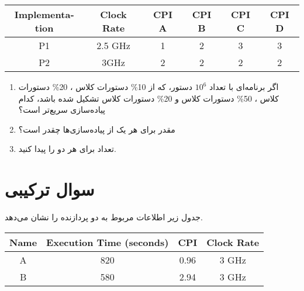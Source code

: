 \documentclass[11pt]{article}
\newcommand{\hosna}{حسنا رجایی}
\newcommand{\cpi}{\lr{CPI} }
\begin{document}
\begin{table}[H]
    \begin{latin}
        \begin{center}
            \begin{tabular}{|c|c|c|c|c|c|}
                \hline
                Implementation & Clock Rate & CPI A & CPI B & CPI C & CPI D \\
                \hline
                P1 & 2.5 GHz & 1 & 2 & 3 & 3 \\
                \hline
                P2 & 3GHz & 2 &  2 & 2 &  2 \\
                \hline
            \end{tabular}
        \end{center}
    \end{latin}
\end{table}

\begin{enumerate}
    \item 
    اگر برنامه‌ای با تعداد 
    $10^6$
    دستور، که از 
    10\% دستورات کلاس ،
    20\% دستورات کلاس ،
    50\% دستورات کلاس  و
    20\% دستورات کلاس  
    تشکیل شده باشد، کدام پیاده‌سازی سریع‌تر است؟
    \item 
    مقدر \cpi برای هر یک از پیاده‌سازی‌ها چقدر است؟
    \item 
    تعداد  برای هر دو را پیدا‌ کنید.
\end{enumerate}

\section[سوال ترکیبی]{سوال ترکیبی\RTLfootnote{\hosna}}
جدول زیر اطلاعات مربوط به دو پردازنده را نشان می‌دهد.
\begin{table}[H]
    \begin{latin}
        \begin{center}
            \begin{tabular}{|c|c|c|c|}
                \hline
                Name & Execution Time (seconds) & CPI & Clock Rate \\
                \hline
                \hline
                A & 820 & 0.96 & 3 GHz \\
                \hline
                B & 580 & 2.94 & 3 GHz \\
                \hline
            \end{tabular}
        \end{center}
    \end{latin}
\end{table}
\end{document}
